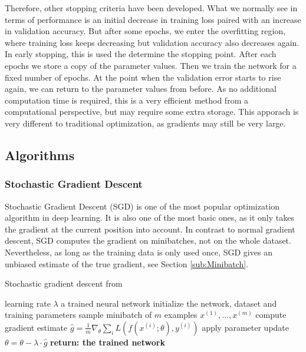 Therefore, other stopping criteria have been developed. What we normally see in
terms of performance is an initial decrease in training loss paired with an
increase in validation accuracy. But after some epochs, we enter the overfitting
region, where training loss keeps decreasing but validation accuracy also
decreases again. In early stopping, this is used the determine the stopping
point. After each epochs we store a copy of the parameter values. Then we train
the network for a fixed number of epochs. At the point when the validation error
starts to rise again, we can return to the parameter values from before. As no additional
computation time is required, this is a very efficient method from a
computational perspective, but may require some extra storage. This apporach is
very different to traditional optimization, as gradients may still be very large.



\subsection{Algorithms}
\subsubsection{Stochastic Gradient Descent}\label{SGD}
Stochastic Gradient Descent (SGD) is one of the most popular optimization
algorithm in deep learning. It is also one of the most basic ones, as it only
takes the gradient at the current position into account. In contrast to normal
gradient descent, SGD computes the gradient on minibatches, not on the whole
dataset. Nevertheless, as long as the training data is only used once, SGD gives
an unbiased estimate of the true gradient, see Section \ref{sub:Minibatch}. 

\begin{algorithm}
    \hypertarget{alg:SGD}{}
    \begin{algorithmic}[1]
        \caption{Stochastic gradient descent from \cite{Goodfellow-et-al-2016}}
        \REQUIRE learning rate $\lambda$
        \ENSURE a trained neural network
        \STATE initialize the network, dataset and training parameters
            \STATE sample minibatch of $m$ examples ${x^{(1)}, ... ,x^{(m)}}$
            \STATE compute gradient estimate $\hat{g}=\frac{1}{m} \nabla_\theta \sum_i L(f(x^{(i)};\theta),y^{(i)})$
            \STATE apply parameter update $\theta=\theta-\lambda\cdot\hat{g}$
        \ENDWHILE
        \STATE \textbf{return: the trained network}
    \end{algorithmic}
\end{algorithm}


